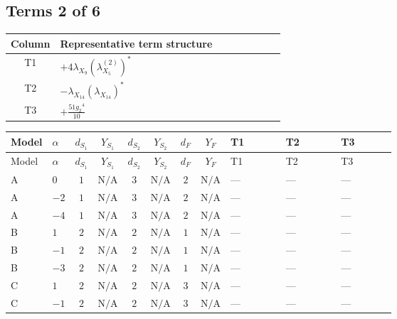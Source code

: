 \documentclass[8pt]{article}
\begin{document}
\begin{landscape}
\subsection*{Terms 2 of 6}
\begin{center}
\begin{tabular}{@{}c >{\raggedright\arraybackslash}p{0.82\linewidth}@{}}
\toprule
Column & Representative term structure \\
\midrule
T1 & \(\displaystyle +4 {\lambda_{X_{9}}} \left({\lambda_{X_{5}}^{(2)}}\right)^{*}\) \\
\midrule
T2 & \(\displaystyle -{\lambda_{X_{14}}} \left({\lambda_{X_{14}}}\right)^{*}\) \\
\midrule
T3 & \(\displaystyle +\frac{51 {g_2}^4}{10}\) \\
\midrule
\bottomrule
\end{tabular}
\end{center}
\smallskip
\tiny
\begin{longtable}{@{}llcccccc >{\raggedright\arraybackslash}p{0.21\linewidth} >{\raggedright\arraybackslash}p{0.21\linewidth} >{\raggedright\arraybackslash}p{0.21\linewidth}@{}}
\toprule
Model & $\alpha$ & $d_{S_1}$ & $Y_{S_1}$ & $d_{S_2}$ & $Y_{S_2}$ & $d_F$ & $Y_F$ & T1 & T2 & T3 \\
\midrule
\endfirsthead
\toprule
Model & $\alpha$ & $d_{S_1}$ & $Y_{S_1}$ & $d_{S_2}$ & $Y_{S_2}$ & $d_F$ & $Y_F$ & T1 & T2 & T3 \\
\midrule
\endhead
A & $0$ & $1$ & $\text{N/A}$ & $3$ & $\text{N/A}$ & $2$ & $\text{N/A}$ & --- & --- & --- \\
\midrule
A & $-2$ & $1$ & $\text{N/A}$ & $3$ & $\text{N/A}$ & $2$ & $\text{N/A}$ & --- & --- & --- \\
\midrule
A & $-4$ & $1$ & $\text{N/A}$ & $3$ & $\text{N/A}$ & $2$ & $\text{N/A}$ & --- & --- & --- \\
\midrule
B & $1$ & $2$ & $\text{N/A}$ & $2$ & $\text{N/A}$ & $1$ & $\text{N/A}$ & --- & --- & --- \\
\midrule
B & $-1$ & $2$ & $\text{N/A}$ & $2$ & $\text{N/A}$ & $1$ & $\text{N/A}$ & --- & --- & --- \\
\midrule
B & $-3$ & $2$ & $\text{N/A}$ & $2$ & $\text{N/A}$ & $1$ & $\text{N/A}$ & --- & --- & --- \\
\midrule
C & $1$ & $2$ & $\text{N/A}$ & $2$ & $\text{N/A}$ & $3$ & $\text{N/A}$ & --- & --- & --- \\
\midrule
C & $-1$ & $2$ & $\text{N/A}$ & $2$ & $\text{N/A}$ & $3$ & $\text{N/A}$ & --- & --- & --- \\

\end{longtable}
\end{landscape}
\end{document}
